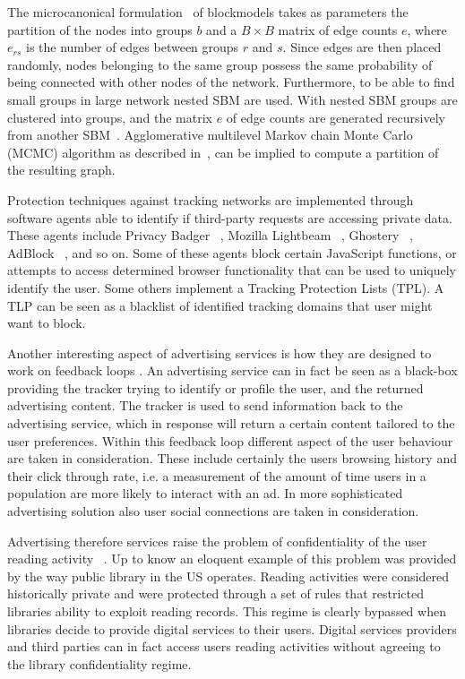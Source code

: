 The microcanonical formulation~\cite{peixoto2012entropy} of blockmodels takes as parameters the partition of the nodes into groups $b$ and a $B \times B$ matrix of edge counts $e$, where $e_{rs}$ is the number of edges between groups $r$ and $s$. Since edges are then placed randomly, nodes belonging to the same group possess the same probability of being connected with other nodes of the network. Furthermore, to be able to find small groups in large network nested SBM are used. With nested SBM groups are clustered into groups, and the matrix $e$ of edge counts are generated recursively from another SBM~\cite{peixoto2014hierarchical}. Agglomerative multilevel Markov chain Monte Carlo (MCMC) algorithm as described in~\cite{peixoto2014efficient}, can be implied to compute a partition of the resulting graph.

Protection techniques against tracking networks are implemented through software agents able to identify if third-party requests are accessing private data. These agents include Privacy Badger ~\cite{privacy-badger}, Mozilla Lightbeam ~\cite{lightbeam}, Ghostery ~\cite{ghostery}, AdBlock ~\cite{adblock}, and so on. Some of these agents block certain JavaScript functions, or attempts to access determined browser functionality that can be used to uniquely identify the user. Some others implement a Tracking Protection Lists (TPL). A TLP can be seen as a blacklist of identified tracking domains that user might want to block. 

Another interesting aspect of advertising services is how they are designed to work on feedback loops \cite{degeling2016your}. An advertising service can in fact be seen as a black-box providing the tracker trying to identify or profile the user, and the returned advertising content. The tracker is used to send information back to the advertising service, which in response will return a certain content tailored to the user preferences. Within this feedback loop different aspect of the user behaviour are taken in consideration. These include certainly the users browsing history and their click through rate, i.e. a measurement of the amount of time users in a population are more likely to interact with an ad. In more sophisticated advertising solution also user social connections are taken in consideration.

Advertising therefore services raise the problem of confidentiality of the user reading activity ~\cite{ard2013confidentiality}. Up to know an eloquent example of this problem was provided by the way public library in the US operates. Reading activities were considered historically private and were protected through a set of rules that restricted libraries ability to exploit reading records. This regime is clearly bypassed when libraries decide to provide digital services to their users. Digital services providers and third parties can in fact access users reading activities without agreeing to the library confidentiality regime.

